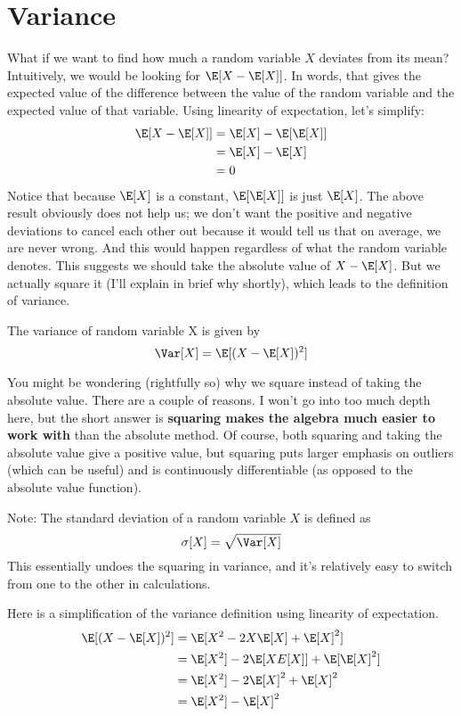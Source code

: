 \section*{Variance}
What if we want to find how much a random variable $X$ deviates from its mean? Intuitively, we would be looking for $\E[X - \E[X]]$. In words, that gives the expected value of the difference between the value of the random variable and the expected value of that variable. Using linearity of expectation, let’s simplify:
    \begin{align*}
        \E[X - \E[X]] &= \E[X] - \E[\E[X]] \\
        &= \E[X] - \E[X] \\
        &= 0
    \end{align*}
Notice that because $\E[X]$ is a constant, $\E[\E[X]]$ is just $\E[X]$. The above result obviously does not help us; we don’t want the positive and negative deviations to cancel each other out because it would tell us that on average, we are never wrong. And this would happen regardless of what the random variable denotes. This suggests we should take the absolute value of $X - \E[X]$. But we actually square it (I’ll explain in brief why shortly), which leads to the definition of variance.

\begin{definition}
    The variance of random variable X is given by
    $$
    \Var[X] = \E[(X - \E[X])^{2}]
    $$
\end{definition}
You might be wondering (rightfully so) why we square instead of taking the absolute value. There are a couple of reasons. I won’t go into too much depth here, but the short answer is \textbf{squaring makes the algebra much easier to work with} than the absolute method. Of course, both squaring and taking the absolute value give a positive value, but squaring puts larger emphasis on outliers (which can be useful) and is continuously differentiable (as opposed to the absolute value function).

\vspace{2.5mm}

Note: The standard deviation of a random variable $X$ is defined as
$$
\sigma[X] = \sqrt{\Var[X]}
$$
This essentially undoes the squaring in variance, and it’s relatively easy to switch from one to the other in calculations.

\vspace{2.5mm}

Here is a simplification of the variance definition using linearity of expectation.
    \begin{align*}
    \E[(X - \E[X])^{2}] &= \E[X^{2} - 2X\E[X] + \E[X]^{2}] \\
    &= \E[X^{2}] - 2\E[XE[X]] + \E[\E[X]^{2}] \\
    &= \E[X^{2}] - 2\E[X]^{2} + \E[X]^{2} \\
    &= \E[X^{2}] - \E[X]^{2}
    \end{align*}

